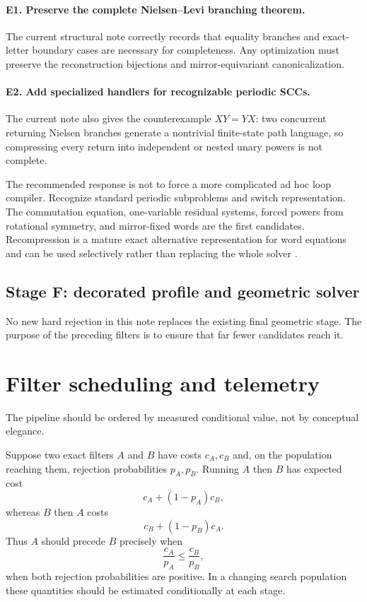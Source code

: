 \documentclass[11pt]{article}
\theoremstyle{definition}
\theoremstyle{remark}
\begin{document}
\paragraph{E1. Preserve the complete Nielsen--Levi branching theorem.}
The current structural note correctly records that equality branches and exact-letter boundary cases are necessary for completeness.  Any optimization must preserve the reconstruction bijections and mirror-equivariant canonicalization.

\paragraph{E2. Add specialized handlers for recognizable periodic SCCs.}
The current note also gives the counterexample $XY=YX$: two concurrent returning Nielsen branches generate a nontrivial finite-state path language, so compressing every return into independent or nested unary powers is not complete.

The recommended response is not to force a more complicated ad hoc loop compiler.  Recognize standard periodic subproblems and switch representation.  The commutation equation, one-variable residual systems, forced powers from rotational symmetry, and mirror-fixed words are the first candidates.  Recompression is a mature exact alternative representation for word equations and can be used selectively rather than replacing the whole solver \cite{Jez2013}.

\subsection{Stage F: decorated profile and geometric solver}

No new hard rejection in this note replaces the existing final geometric stage.  The purpose of the preceding filters is to ensure that far fewer candidates reach it.

\section{Filter scheduling and telemetry}

The pipeline should be ordered by measured conditional value, not by conceptual elegance.

Suppose two exact filters $A$ and $B$ have costs $c_A,c_B$ and, on the population reaching them, rejection probabilities $p_A,p_B$.  Running $A$ then $B$ has expected cost
\[
  c_A+(1-p_A)c_B,
\]
whereas $B$ then $A$ costs
\[
  c_B+(1-p_B)c_A.
\]
Thus $A$ should precede $B$ precisely when
\[
  \frac{c_A}{p_A}\le \frac{c_B}{p_B},
\]
when both rejection probabilities are positive.  In a changing search population these quantities should be estimated conditionally at each stage.
\end{document}

